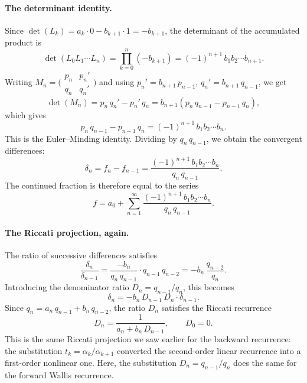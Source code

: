 \documentclass{article}
\begin{document}
\paragraph{The determinant identity.}
Since $\det(L_k) = a_k \cdot 0 - b_{k+1} \cdot 1 = -b_{k+1}$, the determinant of the accumulated product is
\begin{equation}
  \det(L_0 L_1 \cdots L_n) = \prod_{k=0}^{n} (-b_{k+1}) = (-1)^{n+1}\, b_1 b_2 \cdots b_{n+1}.
\end{equation}
Writing $M_n = \bigl(\begin{smallmatrix} p_n & p_n' \\ q_n & q_n' \end{smallmatrix}\bigr)$ and using $p_n' = b_{n+1}\, p_{n-1}$, $q_n' = b_{n+1}\, q_{n-1}$, we get
\begin{equation}
  \det(M_n) = p_n\, q_n' - p_n'\, q_n = b_{n+1}(p_n\, q_{n-1} - p_{n-1}\, q_n),
\end{equation}
which gives
\begin{equation}\label{eq:det-identity}
  p_n\, q_{n-1} - p_{n-1}\, q_n = (-1)^{n+1}\, b_1 b_2 \cdots b_n.
\end{equation}
This is the Euler--Minding identity. Dividing by $q_n\, q_{n-1}$, we obtain the convergent differences:
\begin{equation}
  \delta_n = f_n - f_{n-1} = \frac{(-1)^{n+1}\, b_1 b_2 \cdots b_n}{q_n\, q_{n-1}}.
\end{equation}
The continued fraction is therefore equal to the series
\begin{equation}
  f = a_0 + \sum_{n=1}^{\infty} \frac{(-1)^{n+1}\, b_1 b_2 \cdots b_n}{q_n\, q_{n-1}}.
\end{equation}

\paragraph{The Riccati projection, again.}
The ratio of successive differences satisfies
\begin{equation}
  \frac{\delta_n}{\delta_{n-1}}
  = \frac{-b_n}{q_n\, q_{n-1}} \cdot q_{n-1}\, q_{n-2}
  = -b_n\,\frac{q_{n-2}}{q_n}.
\end{equation}
Introducing the denominator ratio $D_n = q_{n-1}/q_n$, this becomes
\begin{equation}
  \delta_n = -b_n\, D_{n-1}\, D_n \cdot \delta_{n-1}.
\end{equation}
Since $q_n = a_n\, q_{n-1} + b_n\, q_{n-2}$, the ratio $D_n$ satisfies the Riccati recurrence
\begin{equation}
  D_n = \frac{1}{a_n + b_n\, D_{n-1}}, \qquad D_0 = 0.
\end{equation}
This is the same Riccati projection we saw earlier for the backward recurrence: the substitution $t_k = \alpha_k/\alpha_{k+1}$ converted the second-order linear recurrence into a first-order nonlinear one. Here, the substitution $D_n = q_{n-1}/q_n$ does the same for the forward Wallis recurrence.
\end{document}
